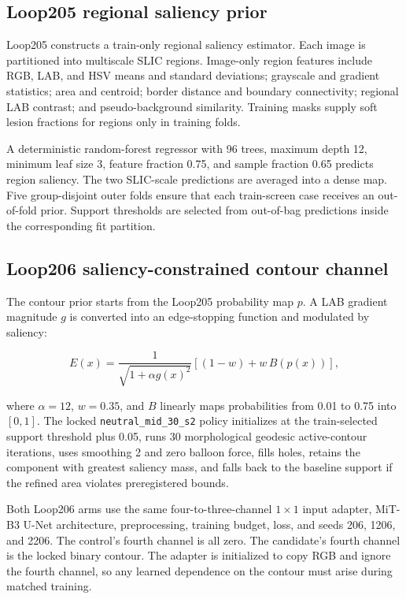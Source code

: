 \subsection{Loop205 regional saliency prior}

Loop205 constructs a train-only regional saliency estimator. Each image is partitioned into multiscale SLIC regions. Image-only region features include RGB, LAB, and HSV means and standard deviations; grayscale and gradient statistics; area and centroid; border distance and boundary connectivity; regional LAB contrast; and pseudo-background similarity. Training masks supply soft lesion fractions for regions only in training folds.

A deterministic random-forest regressor with 96 trees, maximum depth 12, minimum leaf size 3, feature fraction 0.75, and sample fraction 0.65 predicts region saliency. The two SLIC-scale predictions are averaged into a dense map. Five group-disjoint outer folds ensure that each train-screen case receives an out-of-fold prior. Support thresholds are selected from out-of-bag predictions inside the corresponding fit partition.

\subsection{Loop206 saliency-constrained contour channel}

The contour prior starts from the Loop205 probability map $p$. A LAB gradient magnitude $g$ is converted into an edge-stopping function and modulated by saliency:

\begin{equation}
E(x)=\frac{1}{\sqrt{1+\alpha g(x)^2}}\left[(1-w)+w\,B(p(x))\right],
\end{equation}

where $\alpha=12$, $w=0.35$, and $B$ linearly maps probabilities from 0.01 to 0.75 into $[0,1]$. The locked \texttt{neutral\_mid\_30\_s2} policy initializes at the train-selected support threshold plus 0.05, runs 30 morphological geodesic active-contour iterations, uses smoothing 2 and zero balloon force, fills holes, retains the component with greatest saliency mass, and falls back to the baseline support if the refined area violates preregistered bounds.

Both Loop206 arms use the same four-to-three-channel $1\times1$ input adapter, MiT-B3 U-Net architecture, preprocessing, training budget, loss, and seeds 206, 1206, and 2206. The control's fourth channel is all zero. The candidate's fourth channel is the locked binary contour. The adapter is initialized to copy RGB and ignore the fourth channel, so any learned dependence on the contour must arise during matched training.

